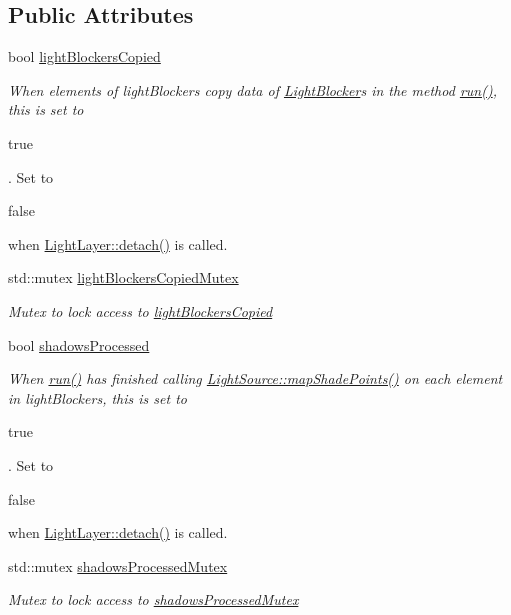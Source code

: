 \subsection*{Public Attributes}
\begin{DoxyCompactItemize}
\item 
bool \hyperlink{classlighting_1_1LightRunnable_a46924d29904d80326c4bdeb093a2b4be}{light\+Blockers\+Copied}
\begin{DoxyCompactList}\small\item\em When elements of light\+Blockers copy data of \hyperlink{classlighting_1_1LightBlocker}{Light\+Blocker}s in the method \hyperlink{classlighting_1_1LightRunnable_abd7dfb6a9fc5efd3730326eb85d852d0}{run()}, this is set to 
\begin{DoxyCode}
\textcolor{keyword}{true}
\end{DoxyCode}
. Set to 
\begin{DoxyCode}
\textcolor{keyword}{false}
\end{DoxyCode}
 when \hyperlink{classlighting_1_1LightLayer_ac4f833f7d7d72586f8efef6967282889}{Light\+Layer\+::detach()} is called. \end{DoxyCompactList}\item 
std\+::mutex \hyperlink{classlighting_1_1LightRunnable_a78dbcc0b308537a7b84776b9b3c79b00}{light\+Blockers\+Copied\+Mutex}
\begin{DoxyCompactList}\small\item\em Mutex to lock access to \hyperlink{classlighting_1_1LightRunnable_a46924d29904d80326c4bdeb093a2b4be}{light\+Blockers\+Copied} \end{DoxyCompactList}\item 
bool \hyperlink{classlighting_1_1LightRunnable_a1419a712f1959e928739b95fe43b3171}{shadows\+Processed}
\begin{DoxyCompactList}\small\item\em When \hyperlink{classlighting_1_1LightRunnable_abd7dfb6a9fc5efd3730326eb85d852d0}{run()} has finished calling \hyperlink{classlighting_1_1LightSource_a5bbde61a54af327d43dc4afee751412c}{Light\+Source\+::map\+Shade\+Points()} on each element in light\+Blockers, this is set to 
\begin{DoxyCode}
\textcolor{keyword}{true}
\end{DoxyCode}
. Set to 
\begin{DoxyCode}
\textcolor{keyword}{false}
\end{DoxyCode}
 when \hyperlink{classlighting_1_1LightLayer_ac4f833f7d7d72586f8efef6967282889}{Light\+Layer\+::detach()} is called. \end{DoxyCompactList}\item 
std\+::mutex \hyperlink{classlighting_1_1LightRunnable_a6c66e5f8a25b1e9c6bb1263d52d777bf}{shadows\+Processed\+Mutex}
\begin{DoxyCompactList}\small\item\em Mutex to lock access to \hyperlink{classlighting_1_1LightRunnable_a6c66e5f8a25b1e9c6bb1263d52d777bf}{shadows\+Processed\+Mutex} \end{DoxyCompactList}\end{DoxyCompactItemize}


